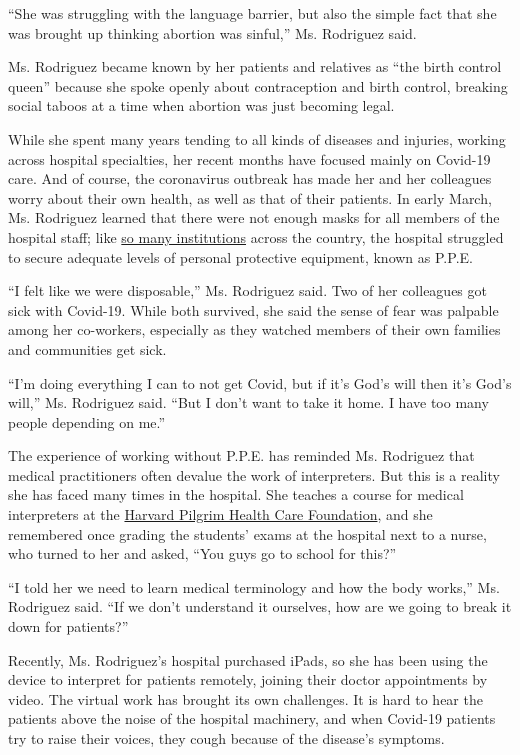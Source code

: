 ``She was struggling with the language barrier, but also the simple fact
that she was brought up thinking abortion was sinful,'' Ms. Rodriguez
said.

Ms. Rodriguez became known by her patients and relatives as ``the birth
control queen'' because she spoke openly about contraception and birth
control, breaking social taboos at a time when abortion was just
becoming legal.

While she spent many years tending to all kinds of diseases and
injuries, working across hospital specialties, her recent months have
focused mainly on Covid-19 care. And of course, the coronavirus outbreak
has made her and her colleagues worry about their own health, as well as
that of their patients. In early March, Ms. Rodriguez learned that there
were not enough masks for all members of the hospital staff; like
\href{https://www.nytimes3xbfgragh.onion/2020/07/08/health/coronavirus-masks-ppe-doc.html}{so
many institutions} across the country, the hospital struggled to secure
adequate levels of personal protective equipment, known as P.P.E.

``I felt like we were disposable,'' Ms. Rodriguez said. Two of her
colleagues got sick with Covid-19. While both survived, she said the
sense of fear was palpable among her co-workers, especially as they
watched members of their own families and communities get sick.

``I'm doing everything I can to not get Covid, but if it's God's will
then it's God's will,'' Ms. Rodriguez said. ``But I don't want to take
it home. I have too many people depending on me.''

The experience of working without P.P.E. has reminded Ms. Rodriguez that
medical practitioners often devalue the work of interpreters. But this
is a reality she has faced many times in the hospital. She teaches a
course for medical interpreters at the
\href{https://www.harvardpilgrim.org/public/our-foundation}{Harvard
Pilgrim Health Care Foundation}, and she remembered once grading the
students' exams at the hospital next to a nurse, who turned to her and
asked, ``You guys go to school for this?''

``I told her we need to learn medical terminology and how the body
works,'' Ms. Rodriguez said. ``If we don't understand it ourselves, how
are we going to break it down for patients?''

Recently, Ms. Rodriguez's hospital purchased iPads, so she has been
using the device to interpret for patients remotely, joining their
doctor appointments by video. The virtual work has brought its own
challenges. It is hard to hear the patients above the noise of the
hospital machinery, and when Covid-19 patients try to raise their
voices, they cough because of the disease's symptoms.

